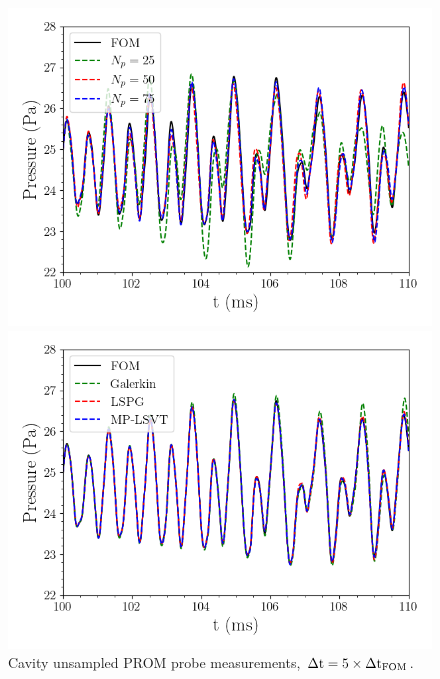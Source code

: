 \begin{figure}
	\begin{minipage}{0.49\linewidth}
		\includegraphics[width=0.99\linewidth]{Chapters/CavityAndCVRC/Images/cavity/unsampled/pressure_probe_unsampled_modes.png}
	\end{minipage}
	\begin{minipage}{0.49\linewidth}
		\includegraphics[width=0.99\linewidth]{Chapters/CavityAndCVRC/Images/cavity/unsampled/pressure_probe_unsampled_methods.png}
	\end{minipage}
	\caption{\label{fig:cavityUnsampledROMProbes}Cavity unsampled PROM probe measurements, $\Delta \text{t} = 5 \times \Delta \text{t}_{\text{FOM}}$.}
\end{figure}

